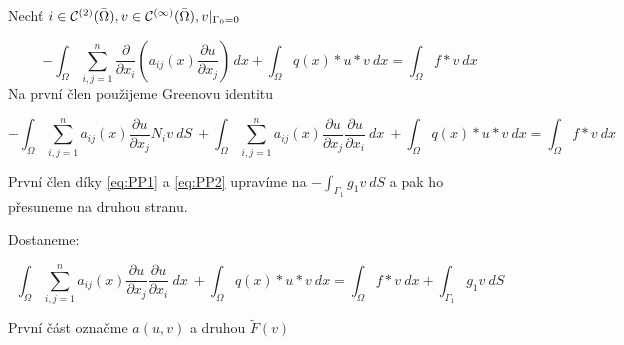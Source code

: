 \documentclass[../main.tex]{subfiles}
\begin{document}
Nechť $i\in \mathcal{C}^{(2)}(\bar{\Omega}), v\in\mathcal{C}^{(\infty)}(\bar{\Omega}), v|_{\Gamma_0 = 0}$

\begin{equation}
    - \int_\Omega \sum_{i,j = 1}^{n} \frac{\partial}{\partial x_i} \left ( a_{ij}(x) \frac{\partial u}{\partial x_j}\right ) \, dx + \int_\Omega q(x)*u*v \ dx = \int_\Omega f*v \ dx 
\end{equation}
Na první člen použijeme Greenovu identitu

\begin{equation}
    - \int_\Omega \sum_{i,j = 1}^{n}a_{ij}(x) \frac{\partial u }{\partial x_j} N_i v \ dS \
    + \int_\Omega \sum_{i,j = 1}^{n}a_{ij}(x)\frac{\partial u }{\partial x_j}\frac{\partial u }{\partial x_i}\ dx \
    + \int_\Omega q(x)*u*v \ dx = \int_\Omega f*v \ dx 
\end{equation}

První člen díky \eqref{eq:PP1} a \eqref{eq:PP2} upravíme na $- \int_{\Gamma_1} g_1 v \ dS$ a pak ho přesuneme na druhou stranu. 

Dostaneme: 

\begin{equation}
    \int_\Omega \sum_{i,j = 1}^{n}a_{ij}(x)\frac{\partial u }{\partial x_j}\frac{\partial u }{\partial x_i}\ dx \
    + \int_\Omega q(x)*u*v \ dx = \int_\Omega f*v \ dx + \int_{\Gamma_1} g_1 v \ dS
\end{equation}

První část označme $a(u,v)$ a druhou $\tilde{F}(v)$
\end{document}
